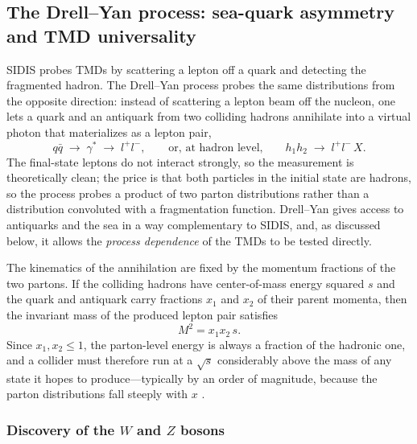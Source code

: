 \FloatBarrier

\subsection{The Drell--Yan process: sea-quark asymmetry and TMD universality}
\label{subsec:drell-yan}

SIDIS probes TMDs by scattering a lepton off a quark and detecting the fragmented hadron.
The Drell--Yan process probes the same distributions from the opposite direction: instead
of scattering a lepton beam off the nucleon, one lets a quark and an antiquark from two
colliding hadrons annihilate into a virtual photon that materializes as a lepton pair,
\begin{equation}
    q\bar q \;\rightarrow\; \gamma^{*} \;\rightarrow\; l^{+}l^{-},
    \qquad\text{or, at hadron level,}\qquad
    h_{1}h_{2} \;\rightarrow\; l^{+}l^{-}\,X.
    \label{eq:drell-yan}
\end{equation}
The final-state leptons do not interact strongly, so the measurement is theoretically
clean; the price is that both particles in the initial state are hadrons, so the process
probes a product of two parton distributions rather than a distribution convoluted with a
fragmentation function. Drell--Yan gives access to antiquarks and the sea in a way
complementary to SIDIS, and, as discussed below, it allows the \emph{process dependence}
of the TMDs to be tested directly.

The kinematics of the annihilation are fixed by the momentum fractions of the two
partons. If the colliding hadrons have center-of-mass energy squared $s$ and the quark and
antiquark carry fractions $x_{1}$ and $x_{2}$ of their parent momenta, then the invariant
mass of the produced lepton pair satisfies
\begin{equation}
    M^{2} = x_{1}x_{2}\,s .
    \label{eq:dy-mass}
\end{equation}
Since $x_{1},x_{2} \le 1$, the parton-level energy is always a fraction of the hadronic
one, and a collider must therefore run at a $\sqrt{s}$ considerably above the mass of any
state it hopes to produce---typically by an order of magnitude, because the parton
distributions fall steeply with $x$ \cite[Ch.~11]{HalzenMartin1984}.

\subsubsection{Discovery of the \texorpdfstring{$W$}{W} and \texorpdfstring{$Z$}{Z} bosons}
\label{subsubsec:wz-discovery}

